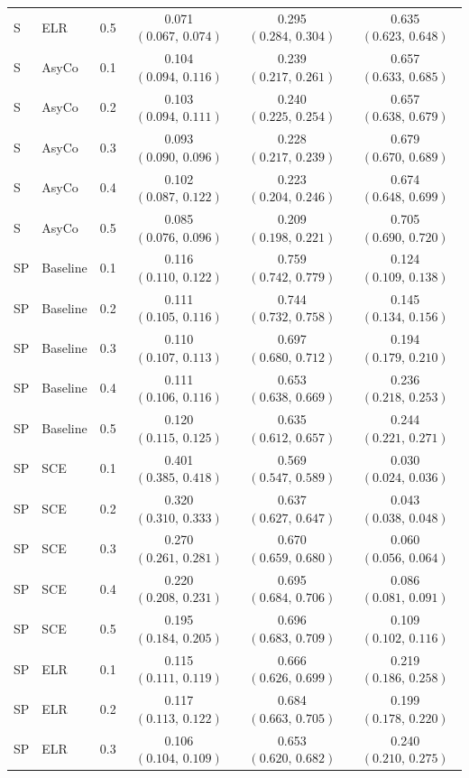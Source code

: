\begin{small}
\begin{longtable}{lllccc}
S & ELR & 0.5 & 0.071 $(0.067,\,0.074)$ & 0.295 $(0.284,\,0.304)$ & 0.635 $(0.623,\,0.648)$ \\
S & AsyCo & 0.1 & 0.104 $(0.094,\,0.116)$ & 0.239 $(0.217,\,0.261)$ & 0.657 $(0.633,\,0.685)$ \\
S & AsyCo & 0.2 & 0.103 $(0.094,\,0.111)$ & 0.240 $(0.225,\,0.254)$ & 0.657 $(0.638,\,0.679)$ \\
S & AsyCo & 0.3 & 0.093 $(0.090,\,0.096)$ & 0.228 $(0.217,\,0.239)$ & 0.679 $(0.670,\,0.689)$ \\
S & AsyCo & 0.4 & 0.102 $(0.087,\,0.122)$ & 0.223 $(0.204,\,0.246)$ & 0.674 $(0.648,\,0.699)$ \\
S & AsyCo & 0.5 & 0.085 $(0.076,\,0.096)$ & 0.209 $(0.198,\,0.221)$ & 0.705 $(0.690,\,0.720)$ \\
SP & Baseline & 0.1 & 0.116 $(0.110,\,0.122)$ & 0.759 $(0.742,\,0.779)$ & 0.124 $(0.109,\,0.138)$ \\
SP & Baseline & 0.2 & 0.111 $(0.105,\,0.116)$ & 0.744 $(0.732,\,0.758)$ & 0.145 $(0.134,\,0.156)$ \\
SP & Baseline & 0.3 & 0.110 $(0.107,\,0.113)$ & 0.697 $(0.680,\,0.712)$ & 0.194 $(0.179,\,0.210)$ \\
SP & Baseline & 0.4 & 0.111 $(0.106,\,0.116)$ & 0.653 $(0.638,\,0.669)$ & 0.236 $(0.218,\,0.253)$ \\
SP & Baseline & 0.5 & 0.120 $(0.115,\,0.125)$ & 0.635 $(0.612,\,0.657)$ & 0.244 $(0.221,\,0.271)$ \\
SP & SCE & 0.1 & 0.401 $(0.385,\,0.418)$ & 0.569 $(0.547,\,0.589)$ & 0.030 $(0.024,\,0.036)$ \\
SP & SCE & 0.2 & 0.320 $(0.310,\,0.333)$ & 0.637 $(0.627,\,0.647)$ & 0.043 $(0.038,\,0.048)$ \\
SP & SCE & 0.3 & 0.270 $(0.261,\,0.281)$ & 0.670 $(0.659,\,0.680)$ & 0.060 $(0.056,\,0.064)$ \\
SP & SCE & 0.4 & 0.220 $(0.208,\,0.231)$ & 0.695 $(0.684,\,0.706)$ & 0.086 $(0.081,\,0.091)$ \\
SP & SCE & 0.5 & 0.195 $(0.184,\,0.205)$ & 0.696 $(0.683,\,0.709)$ & 0.109 $(0.102,\,0.116)$ \\
SP & ELR & 0.1 & 0.115 $(0.111,\,0.119)$ & 0.666 $(0.626,\,0.699)$ & 0.219 $(0.186,\,0.258)$ \\
SP & ELR & 0.2 & 0.117 $(0.113,\,0.122)$ & 0.684 $(0.663,\,0.705)$ & 0.199 $(0.178,\,0.220)$ \\
SP & ELR & 0.3 & 0.106 $(0.104,\,0.109)$ & 0.653 $(0.620,\,0.682)$ & 0.240 $(0.210,\,0.275)$ \\

\end{longtable}
\end{small}
